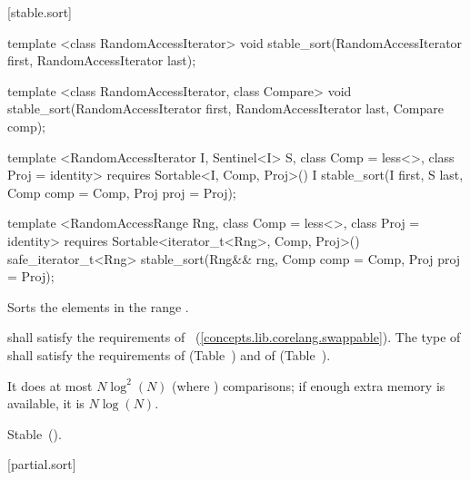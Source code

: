 [stable.sort]{}

%
\begin{removedblock}
\begin{itemdecl}
template <class RandomAccessIterator>
  void stable_sort(RandomAccessIterator first, RandomAccessIterator last);

template <class RandomAccessIterator, class Compare>
  void stable_sort(RandomAccessIterator first, RandomAccessIterator last,
                   Compare comp);
\end{itemdecl}
\end{removedblock}
\begin{addedblock}
\begin{itemdecl}
template <RandomAccessIterator I, Sentinel<I> S, class Comp = less<>,
    class Proj = identity>
  requires Sortable<I, Comp, Proj>()
  I stable_sort(I first, S last, Comp comp = Comp{}, Proj proj = Proj{});

template <RandomAccessRange Rng, class Comp = less<>, class Proj = identity>
  requires Sortable<iterator_t<Rng>, Comp, Proj>()
  safe_iterator_t<Rng>
    stable_sort(Rng&& rng, Comp comp = Comp{}, Proj proj = Proj{});
\end{itemdecl}
\end{addedblock}

\begin{itemdescr}
\pnum
\effects
Sorts the elements in the range .

\begin{removedblock}
\pnum
\requires
{} shall satisfy the requirements of
~(\ref{concepts.lib.corelang.swappable}). The type
of  shall satisfy the requirements of
 (Table~) and of
 (Table~).
\end{removedblock}

\pnum
\complexity
It does at most $N \log^2(N)$
(where
)
comparisons; if enough extra memory is available, it is
$N \log(N)$.

\pnum
\remarks Stable~().
\end{itemdescr}

[partial.sort]{}

